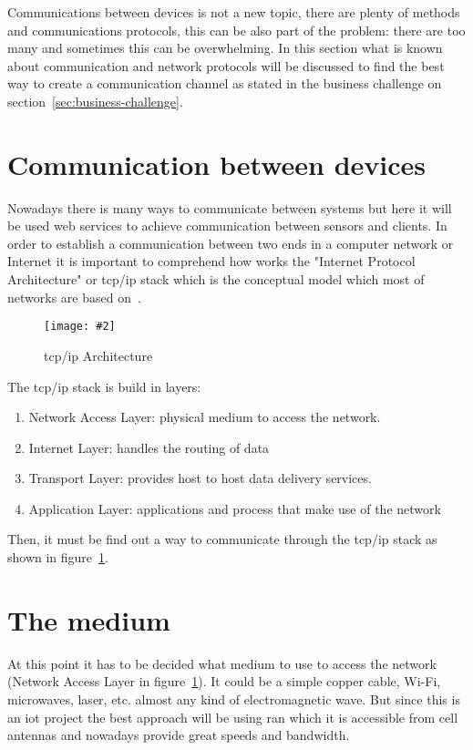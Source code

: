 \documentclass[hidelinks,11pt,a4paper,oneside,article]{memoir}
\newcommand{\putimage}[3][10] %
{
\begin{figure}[h]
	\centering
	\captionsetup{justification=centering}
	\texttt{[image: \#2]}
	\caption{#3}
	\label{fig:#2}
\end{figure}
}
\begin{document}
Communications between devices is not a new topic, there are plenty of methods and communications protocols, this can be also part of the problem: there are too many and sometimes this can be overwhelming. In this section what is known about communication and network protocols will be discussed to find the best way to create a communication channel as stated in the business challenge on section~\ref{sec:business-challenge}.



\section{Communication between devices}
Nowadays there is many ways to communicate between systems but here it will be used web services to achieve communication between sensors and clients. In order to establish a communication between two ends in a computer network or Internet it is important to comprehend how works the "Internet Protocol Architecture" or \gls{tcp}/\gls{ip} stack which is the conceptual model which most of networks are based on~\cite[9]{tcpip}.

	\putimage[5]{tcpip}{\gls{tcp}/\gls{ip} Architecture}

The \gls{tcp}/\gls{ip} stack is build in layers:
\begin{enumerate}
	\item Network Access Layer: physical medium to access the network.
	\item Internet Layer: handles the routing of data
	\item Transport Layer: provides host to host data delivery services.
	\item Application Layer: applications and process that make use of the network
\end{enumerate}
Then, it must be find out a way to communicate through the \gls{tcp}/\gls{ip} stack as shown in figure~\ref{fig:tcpip}.

\section{The medium}\label{sec:the-medium}
At this point it has to be decided what medium to use to access the network (Network Access Layer in figure~\ref{fig:tcpip}). It could be a simple copper cable, Wi-Fi, microwaves, laser, etc. almost any kind of electromagnetic wave. But since this is an \gls{iot} project the best approach will be using \gls{ran} which it is accessible from cell antennas and nowadays provide great speeds and bandwidth.
\end{document}
